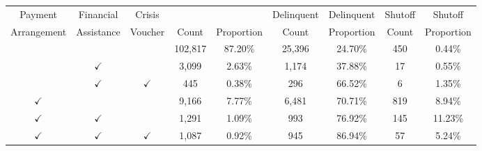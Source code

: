 \begin{tabular}{c|c|c|c|c|c|c|c|c}
\toprule 
\midrule 
Payment & Financial & Crisis &  &  & Delinquent & Delinquent & Shutoff & Shutoff \\
Arrangement & Assistance & Voucher & Count & Proportion & Count & Proportion & Count & Proportion \\
\midrule 
 &  &  & 102,817 & 87.20\% & 25,396 & 24.70\% & 450 & 0.44\% \\
 & $\checkmark$ &  & 3,099 & 2.63\% & 1,174 & 37.88\% & 17 & 0.55\% \\
 & $\checkmark$ & $\checkmark$ & 445 & 0.38\% & 296 & 66.52\% & 6 & 1.35\% \\
$\checkmark$ &  &  & 9,166 & 7.77\% & 6,481 & 70.71\% & 819 & 8.94\% \\
$\checkmark$ & $\checkmark$ &  & 1,291 & 1.09\% & 993 & 76.92\% & 145 & 11.23\% \\
$\checkmark$ & $\checkmark$ & $\checkmark$ & 1,087 & 0.92\% & 945 & 86.94\% & 57 & 5.24\% \\
\midrule 
\bottomrule 
\end{tabular}
